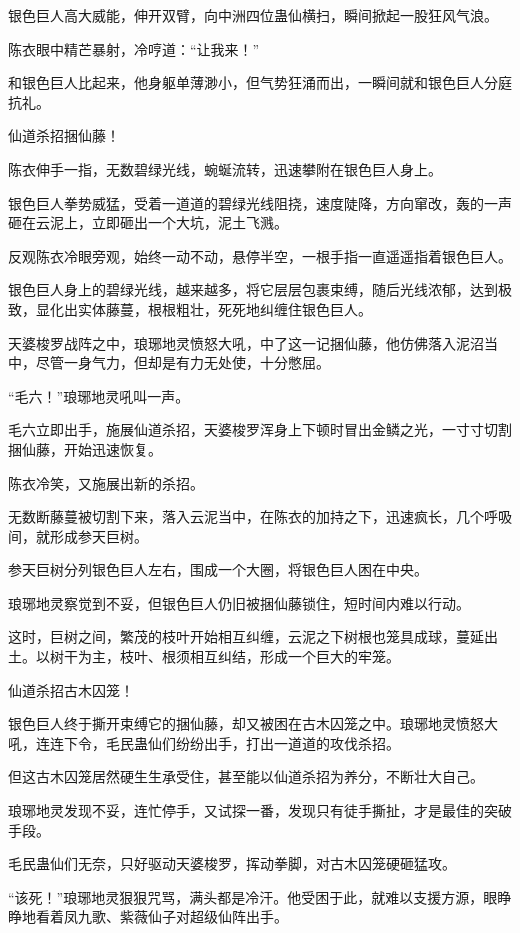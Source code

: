 
\begin{this_body}

银色巨人高大威能，伸开双臂，向中洲四位蛊仙横扫，瞬间掀起一股狂风气浪。

陈衣眼中精芒暴射，冷哼道：“让我来！”

和银色巨人比起来，他身躯单薄渺小，但气势狂涌而出，一瞬间就和银色巨人分庭抗礼。

仙道杀招捆仙藤！

陈衣伸手一指，无数碧绿光线，蜿蜒流转，迅速攀附在银色巨人身上。

银色巨人拳势威猛，受着一道道的碧绿光线阻挠，速度陡降，方向窜改，轰的一声砸在云泥上，立即砸出一个大坑，泥土飞溅。

反观陈衣冷眼旁观，始终一动不动，悬停半空，一根手指一直遥遥指着银色巨人。

银色巨人身上的碧绿光线，越来越多，将它层层包裹束缚，随后光线浓郁，达到极致，显化出实体藤蔓，根根粗壮，死死地纠缠住银色巨人。

天婆梭罗战阵之中，琅琊地灵愤怒大吼，中了这一记捆仙藤，他仿佛落入泥沼当中，尽管一身气力，但却是有力无处使，十分憋屈。

“毛六！”琅琊地灵吼叫一声。

毛六立即出手，施展仙道杀招，天婆梭罗浑身上下顿时冒出金鳞之光，一寸寸切割捆仙藤，开始迅速恢复。

陈衣冷笑，又施展出新的杀招。

无数断藤蔓被切割下来，落入云泥当中，在陈衣的加持之下，迅速疯长，几个呼吸间，就形成参天巨树。

参天巨树分列银色巨人左右，围成一个大圈，将银色巨人困在中央。

琅琊地灵察觉到不妥，但银色巨人仍旧被捆仙藤锁住，短时间内难以行动。

这时，巨树之间，繁茂的枝叶开始相互纠缠，云泥之下树根也笼具成球，蔓延出土。以树干为主，枝叶、根须相互纠结，形成一个巨大的牢笼。

仙道杀招古木囚笼！

银色巨人终于撕开束缚它的捆仙藤，却又被困在古木囚笼之中。琅琊地灵愤怒大吼，连连下令，毛民蛊仙们纷纷出手，打出一道道的攻伐杀招。

但这古木囚笼居然硬生生承受住，甚至能以仙道杀招为养分，不断壮大自己。

琅琊地灵发现不妥，连忙停手，又试探一番，发现只有徒手撕扯，才是最佳的突破手段。

毛民蛊仙们无奈，只好驱动天婆梭罗，挥动拳脚，对古木囚笼硬砸猛攻。

“该死！”琅琊地灵狠狠咒骂，满头都是冷汗。他受困于此，就难以支援方源，眼睁睁地看着凤九歌、紫薇仙子对超级仙阵出手。


\end{this_body}
